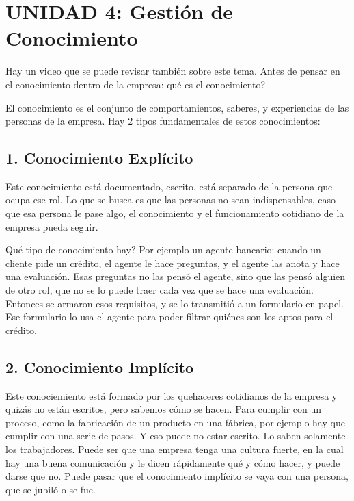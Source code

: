 \hypertarget{unidad-4-gestiuxf3n-de-conocimiento}{%
\section{UNIDAD 4: Gestión de
Conocimiento}\label{unidad-4-gestiuxf3n-de-conocimiento}}

Hay un video que se puede revisar también sobre este tema. Antes de
pensar en el conocimiento dentro de la empresa: qué es el conocimiento?

El conocimiento es el conjunto de comportamientos, saberes, y
experiencias de las personas de la empresa. Hay 2 tipos fundamentales de
estos conocimientos:

\hypertarget{conocimiento-expluxedcito}{%
\subsection{1. Conocimiento Explícito}\label{conocimiento-expluxedcito}}

Este conocimiento está documentado, escrito, está separado de la persona
que ocupa ese rol. Lo que se busca es que las personas no sean
indispensables, caso que esa persona le pase algo, el conocimiento y el
funcionamiento cotidiano de la empresa pueda seguir.

Qué tipo de conocimiento hay? Por ejemplo un agente bancario: cuando un
cliente pide un crédito, el agente le hace preguntas, y el agente las
anota y hace una evaluación. Esas preguntas no las pensó el agente, sino
que las pensó alguien de otro rol, que no se lo puede traer cada vez que
se hace una evaluación. Entonces se armaron esos requisitos, y se lo
transmitió a un formulario en papel. Ese formulario lo usa el agente
para poder filtrar quiénes son los aptos para el crédito.

\hypertarget{conocimiento-impluxedcito}{%
\subsection{2. Conocimiento Implícito}\label{conocimiento-impluxedcito}}

Este conociemiento está formado por los quehaceres cotidianos de la
empresa y quizás no están escritos, pero sabemos cómo se hacen. Para
cumplir con un proceso, como la fabricación de un producto en una
fábrica, por ejemplo hay que cumplir con una serie de pasos. Y eso puede
no estar escrito. Lo saben solamente los trabajadores. Puede ser que una
empresa tenga una cultura fuerte, en la cual hay una buena comunicación
y le dicen rápidamente qué y cómo hacer, y puede darse que no. Puede
pasar que el conocimiento implícito se vaya con una persona, que se
jubiló o se fue.

